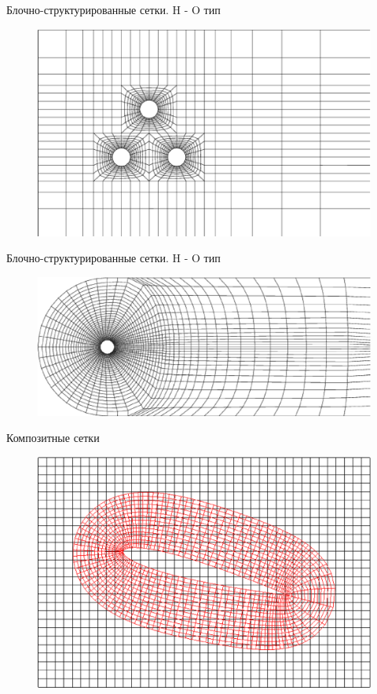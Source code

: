 \documentclass[10pt,xcolor=pst,aspectratio=169]{beamer}
\begin{document}
\begin{frame}{Блочно-структурированные сетки. H - O тип}

	\transdissolve[duration=0.1]
	\justifying
	\large

	\begin{figure}
		\includegraphics[width=0.7\linewidth]{O_H_type_grid_example_2.eps}
	\end{figure}

\end{frame}

\begin{frame}{Блочно-структурированные сетки. H - O тип}

	\transdissolve[duration=0.1]
	\justifying
	\large

	\begin{figure}
		\includegraphics[width=0.8\linewidth]{O_H_type_grid_example_3.eps}
	\end{figure}

\end{frame}

\begin{frame}{Композитные сетки}

	\transdissolve[duration=0.1]
	\justifying
	\large

	\begin{figure}
		\includegraphics[width=0.6\linewidth]{overset_grid_example_1.eps}
	\end{figure}

\end{frame}
\end{document}
